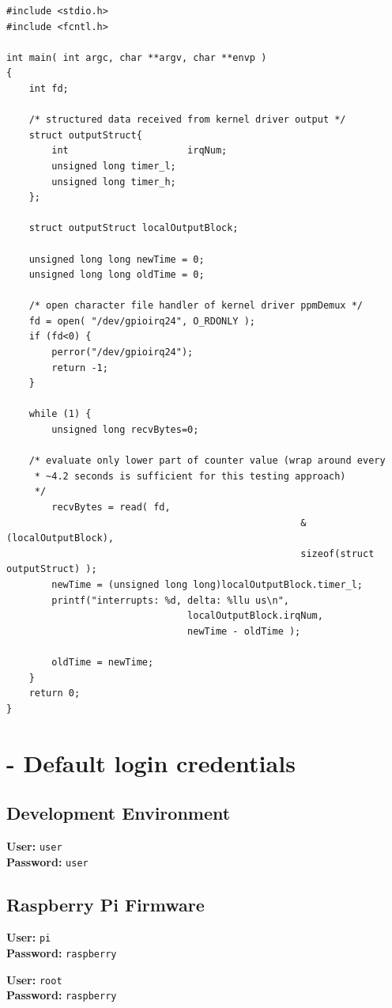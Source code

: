 \begin{lstlisting}[caption={[Source code listing of getPpmDemuxValues.c]Complete soure code of the test file \texttt{getPpmDemuxValues.c} to read the output of the proof-of-concept kernel driver \texttt{ppmDemux}.},label=code:append-ppmDemuxCode:ppmDemusReader]
#include <stdio.h>
#include <fcntl.h>

int main( int argc, char **argv, char **envp )
{
    int fd;

    /* structured data received from kernel driver output */
    struct outputStruct{
        int 					irqNum;
        unsigned long timer_l;
        unsigned long timer_h;
    };

    struct outputStruct localOutputBlock;
    
    unsigned long long newTime = 0;
    unsigned long long oldTime = 0;

    /* open character file handler of kernel driver ppmDemux */    
    fd = open( "/dev/gpioirq24", O_RDONLY );
    if (fd<0) {
        perror("/dev/gpioirq24");
        return -1;
    }

    while (1) {
        unsigned long recvBytes=0;

	/* evaluate only lower part of counter value (wrap around every 
	 * ~4.2 seconds is sufficient for this testing approach) 
	 */
        recvBytes = read( fd, 
													&(localOutputBlock), 
													sizeof(struct outputStruct) );
        newTime = (unsigned long long)localOutputBlock.timer_l; 
        printf("interrupts: %d, delta: %llu us\n",
								localOutputBlock.irqNum, 
								newTime - oldTime );

        oldTime = newTime;
    }
    return 0;
}

\end{lstlisting}

\chapter{- Default login credentials}
\label{sec:d-credentials}

\section{Development Environment}
\label{sec:d-credentials:vm}
\textbf{User:} \texttt{user}\\
\textbf{Password:} \texttt{user}

\section{Raspberry Pi Firmware}
\label{sec:d-credentials:rpi}
\textbf{User:} \texttt{pi}\\
\textbf{Password:} \texttt{raspberry}

\textbf{User:} \texttt{root}\\
\textbf{Password:} \texttt{raspberry}